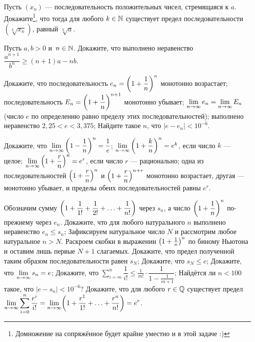 \documentclass[a4paper, 12pt]{article}
\begin{document}


\bigskip
{}
Пусть $(x_n)$ --- последовательность положительных чисел, стремящаяся к $a$.
Докажите\footnote{Домножение на сопряжённое будет крайне уместно и в этой задаче :)}, что тогда для любого $k\in\mathbb{N}$ существует предел последовательности $(\sqrt[k]{x_n})$,
равный $\sqrt[k]{a}$.


Пусть $a,b>0$ и~$n\in\mathbb{N}$.
Докажите, что выполнено неравенство $\dfrac{a^{n+1}}{b^n}\geqslant(n+1)a-nb$.

\label{eee}
Докажите, что
\smallskip
{}
последовательность $e_n = \left(1+\dfrac{1}n\right)^n$ монотонно возрастает;
\smallskip
{}
последовательность $E_n = \left(1+\dfrac{1}{n}\right)^{n+1}$ монотонно убывает;
\smallskip
{}
$\lim\limits_{n \rightarrow \infty} e_n = \lim\limits_{n \rightarrow \infty} E_n$
(число $e$ по определению равно пределу этих последовательностей);
\smallskip
{}
выполнено неравенство $2{,}25<e<3{,}375$;
\medskip
{}
Найдите такое $n$, что $|e - e_n| < 10^{-6}$.

Докажите, что
\smallskip
{}
$\lim\limits_{n \rightarrow \infty}\left(1-\dfrac1n\right)^n = \dfrac{1}{e}$;
\smallskip
{}
$\lim\limits_{n \rightarrow \infty}\left(1+\dfrac{k}{n}\right)^n = e^k$, если число $k$ --- целое;
{}
$\lim\limits_{n \rightarrow \infty}\left(1+\dfrac{r}{n}\right)^n = e^r$, если число $r$ --- рационально;
\smallskip
{}
одна из последовательностей $\left(1+\dfrac{r}{n}\right)^n$ и $\left(1+\dfrac{r}{n}\right)^{n+r}$ монотонно возрастает,
другая --- монотонно убывает, и пределы обеих последовательностей равны $e^r$.

Обозначим сумму $\biggl( 1 + \dfrac{1}{1!} + \dfrac{1}{2!} + \ldots +  \dfrac{1}{n!}\biggr)$ через $s_n$,
а число $\left(1+\dfrac{1}n\right)^n$ по-прежнему через $e_n$.
\smallskip
{}
Докажите, что для любого натурального $n$ выполнено неравенство $e_n \le s_n$;
\smallskip
{}
Зафиксируем натуральное число $N$ и рассмотрим любое натуральное $n>N$.
Раскроем скобки в выражении $\left(1+\frac{1}n\right)^n$ по биному Ньютона
и оставим лишь первые $N+1$ слагаемых.
Докажите, что предел полученной таким образом последовательности равен $s_N$;
\smallskip
{}
Докажите, что $s_N \le e$;
\smallskip
{}
Докажите, что $\lim\limits_{n \rightarrow \infty} s_n = e$;
\smallskip
{}
Докажите, что
$\displaystyle\sum\limits_{i=m}^n \dfrac{1}{i!} \le \frac{1}{m!}\cdot\dfrac{1}{1-\frac{1}{m+1}}$;
\smallskip
{}
Найдётся ли $n < 100$ такое, что $|e - s_n| < 10^{-6}$?
\smallskip
{}
Докажите, что для любого $r\in\mathbb{Q}$ существует предел
$\displaystyle
\lim\limits_{n \rightarrow \infty} \sum\limits_{i=0}^{n} \dfrac{r^i}{i!} =
\lim\limits_{n \rightarrow \infty} \biggl( 1 + \dfrac{r^1}{1!} + \ldots +  \dfrac{r^n}{n!}\biggr) = e^r
$.
\end{document}
